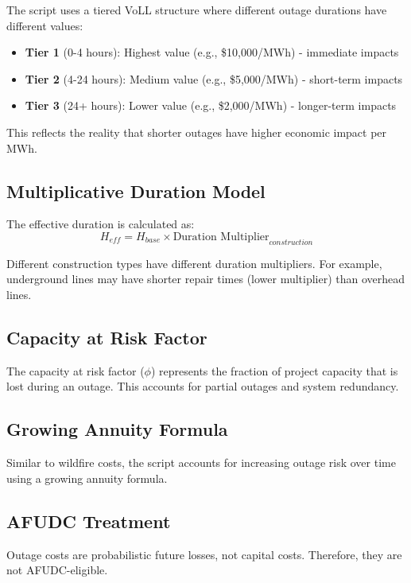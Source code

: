 \documentclass[12pt]{article}
\begin{document}
The script uses a tiered VoLL structure where different outage durations have different values:
\begin{itemize}
    \item \textbf{Tier 1} (0-4 hours): Highest value (e.g., \$10,000/MWh) - immediate impacts
    \item \textbf{Tier 2} (4-24 hours): Medium value (e.g., \$5,000/MWh) - short-term impacts
    \item \textbf{Tier 3} (24+ hours): Lower value (e.g., \$2,000/MWh) - longer-term impacts
\end{itemize}

This reflects the reality that shorter outages have higher economic impact per MWh.

\subsection{Multiplicative Duration Model}

The effective duration is calculated as:
\[
H_{eff} = H_{base} \times \text{Duration Multiplier}_{construction}
\]

Different construction types have different duration multipliers. For example, underground lines may have shorter repair times (lower multiplier) than overhead lines.

\subsection{Capacity at Risk Factor}

The capacity at risk factor ($\phi$) represents the fraction of project capacity that is lost during an outage. This accounts for partial outages and system redundancy.

\subsection{Growing Annuity Formula}

Similar to wildfire costs, the script accounts for increasing outage risk over time using a growing annuity formula.

\subsection{AFUDC Treatment}

Outage costs are probabilistic future losses, not capital costs. Therefore, they are not AFUDC-eligible.
\end{document}
